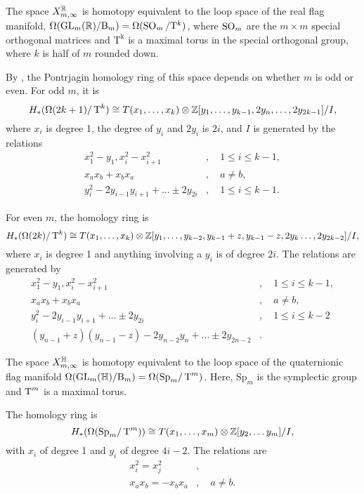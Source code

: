 \begin{theorem}
  The space $X_{m,\infty}^{\mathbb{R}}$ is homotopy equivalent to the loop space
  of the real flag manifold,
  $\Omega(\operatorname{GL}_m(\mathbb{R})/\mathrm{B}_m) = \Omega(\operatorname{SO}_m/\mathrm{T}^{k})$, where
  $\operatorname{SO}_m$ are the $m \times m$ special orthogonal matrices and
  $\mathrm{T^k}$ is a maximal torus in the special orthogonal group,
  where $k$ is half of $m$ rounded down.
  
  By \cite{grbic}, the Pontrjagin homology ring of this space depends
  on whether $m$ is odd or even. For odd $m$, it is
  \[ H_*(\Omega(2k+1)/\operatorname{T}^k) \cong T(x_1,\dots,x_k)\otimes
  \mathbb{Z}[y_1,\dots,y_{k-1},2y_n,\dots,2y_{2k-1}] / I, \]
  where $x_i$ is degree 1, the degree of $y_i$ and $2y_i$ is
  $2i$, and $I$ is generated by the relations
  \begin{align*}
    x_1^2-y_1, x_i^2-x_{i+1}^2&,\quad 1 \leq i \leq k-1, \\
    x_a x_b + x_b x_a&,\quad a \neq b, \\
    y_i^2-2y_{i-1}y_{i+1}+\dots\pm 2y_{2i}&,\quad 1 \leq i \leq k-1.
  \end{align*}

  For even $m$, the homology ring is
  \[ H_*(\Omega(2k)/\operatorname{T}^k) \cong T(x_1,\dots,x_k)\otimes
  \mathbb{Z}[y_1,\dots,y_{k-2},y_{k-1}+z,y_{k-1}-z,2y_k\dots,2y_{2k-2}] /
  I, \]
  where $x_i$ is degree 1 and anything involving a $y_i$ is of degree
  $2i$. The relations are generated by
  \begin{align*}
    x_1^2-y_1, x_i^2-x_{i+1}^2&, \quad 1 \leq i \leq k-1, \\
    x_ax_b+x_bx_a&, \quad a\neq b, \\
    y_i^2-2y_{i-1}y_{i+1}+\dots\pm 2y_{2i}&,\quad 1 \leq i \leq k-2 \\
    (y_{n-1}+z)(y_{n-1}-z)-2y_{n-2}y_n+\dots\pm 2y_{2n-2}&. 
  \end{align*}
\end{theorem}

\begin{theorem}
  The space $X_{m,\infty}^{\mathbb{H}}$ is homotopy equivalent to the loop
  space of the quaternionic flag manifold
  $\Omega(\operatorname{GL}_m(\mathbb{H})/\mathrm{B}_m) = \Omega(\mathrm{Sp}_m/\operatorname{T}^m)$.
  Here, $\mathrm{Sp}_m$ is the symplectic group and $\operatorname{T}^m$ is a
  maximal torus.

  The homology ring is
  \[ H_*(\Omega(\mathrm{Sp}_m/\operatorname{T}^m)) \cong T(x_1,\dots,x_m)\otimes
  \mathbb{Z}[y_2,\dots y_m] / I, \]
  with $x_i$ of degree 1 and $y_i$ of degree $4i-2$. The relations are
  \begin{align*}
    x_i^2 = x_j^2&,\\
    x_a x_b = -x_b x_a&, \quad a\neq b.
  \end{align*}
\end{theorem}

